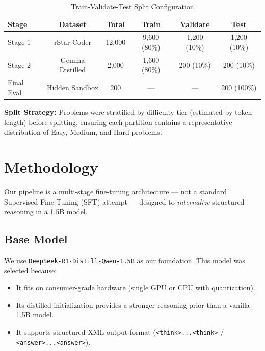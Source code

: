 \documentclass[preprint,12pt]{elsarticle}
\begin{document}
\begin{table}[H]
    \centering
    \caption{Train-Validate-Test Split Configuration}
    \label{tab:split}
    \begin{tabular}{lccccc}
        \toprule
        \textbf{Stage} & \textbf{Dataset} & \textbf{Total} & \textbf{Train} & \textbf{Validate} & \textbf{Test} \\
        \midrule
        Stage 1        & rStar-Coder      & 12,000         & 9,600 (80\%)   & 1,200 (10\%)      & 1,200 (10\%)  \\
        Stage 2        & Gemma Distilled  & 2,000          & 1,600 (80\%)   & 200 (10\%)        & 200 (10\%)    \\
        Final Eval     & Hidden Sandbox   & 200            & ---            & ---               & 200 (100\%)   \\
        \bottomrule
    \end{tabular}
\end{table}

\textbf{Split Strategy:} Problems were stratified by difficulty tier (estimated by token length) before splitting, ensuring each partition contains a representative distribution of Easy, Medium, and Hard problems.

\section{Methodology}
\label{sec:method}

Our pipeline is a multi-stage fine-tuning architecture — not a standard Supervised Fine-Tuning (SFT) attempt — designed to \textit{internalize} structured reasoning in a 1.5B model.

\subsection{Base Model}

We use \texttt{DeepSeek-R1-Distill-Qwen-1.5B} as our foundation. This model was selected because:
\begin{itemize}
    \item It fits on consumer-grade hardware (single GPU or CPU with quantization).
    \item Its distilled initialization provides a stronger reasoning prior than a vanilla 1.5B model.
    \item It supports structured XML output format (\texttt{<think>...<\/think>} / \texttt{<answer>...<\/answer>}).
\end{itemize}
\end{document}
